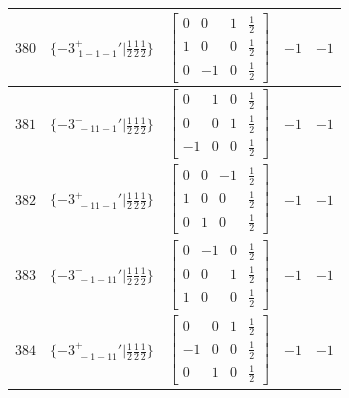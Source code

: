 \documentclass[fleqn,8pt]{jsarticle}
\begin{document}
\begin{longtable}{ccccc}
$ 380 $ & $ \{-3^{+}_{\,\,1-1-1}{}'|\frac{1}{2} \frac{1}{2} \frac{1}{2}\} $ & $ \begin{bmatrix} 0 & 0 & 1 & \frac{1}{2} \\ 1 & 0 & 0 & \frac{1}{2} \\ 0 & -1 & 0 & \frac{1}{2} \end{bmatrix} $ & $ -1 $ & $ -1 $ \\ \hline
$ 381 $ & $ \{-3^{-}_{\,\,-11-1}{}'|\frac{1}{2} \frac{1}{2} \frac{1}{2}\} $ & $ \begin{bmatrix} 0 & 1 & 0 & \frac{1}{2} \\ 0 & 0 & 1 & \frac{1}{2} \\ -1 & 0 & 0 & \frac{1}{2} \end{bmatrix} $ & $ -1 $ & $ -1 $ \\ \hline
$ 382 $ & $ \{-3^{+}_{\,\,-11-1}{}'|\frac{1}{2} \frac{1}{2} \frac{1}{2}\} $ & $ \begin{bmatrix} 0 & 0 & -1 & \frac{1}{2} \\ 1 & 0 & 0 & \frac{1}{2} \\ 0 & 1 & 0 & \frac{1}{2} \end{bmatrix} $ & $ -1 $ & $ -1 $ \\ \hline
$ 383 $ & $ \{-3^{-}_{\,\,-1-11}{}'|\frac{1}{2} \frac{1}{2} \frac{1}{2}\} $ & $ \begin{bmatrix} 0 & -1 & 0 & \frac{1}{2} \\ 0 & 0 & 1 & \frac{1}{2} \\ 1 & 0 & 0 & \frac{1}{2} \end{bmatrix} $ & $ -1 $ & $ -1 $ \\ \hline
$ 384 $ & $ \{-3^{+}_{\,\,-1-11}{}'|\frac{1}{2} \frac{1}{2} \frac{1}{2}\} $ & $ \begin{bmatrix} 0 & 0 & 1 & \frac{1}{2} \\ -1 & 0 & 0 & \frac{1}{2} \\ 0 & 1 & 0 & \frac{1}{2} \end{bmatrix} $ & $ -1 $ & $ -1 $ \\
\end{longtable}
\end{document}
